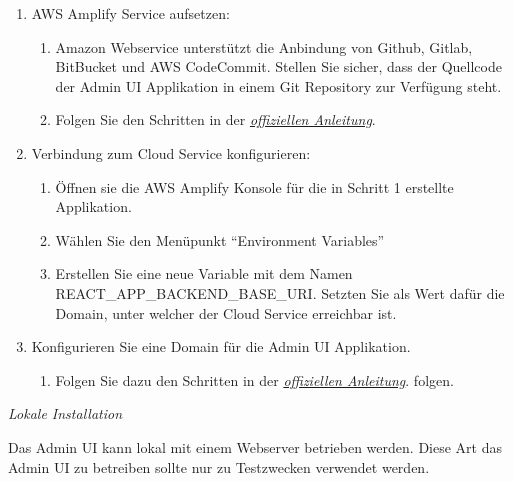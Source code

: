 \begin{enumerate}
    \item AWS Amplify Service aufsetzen:
    \begin{enumerate}
        \item Amazon Webservice unterstützt die Anbindung von Github, Gitlab, BitBucket und AWS CodeCommit. Stellen Sie sicher, dass der Quellcode der Admin UI Applikation in einem Git Repository zur Verfügung steht.
        \item Folgen Sie den Schritten in der \href{https://docs.aws.amazon.com/amplify/latest/userguide/getting-started.html}{\textit{offiziellen Anleitung}}.\cite{aws-amplify}
    \end{enumerate}
    \item Verbindung zum Cloud Service konfigurieren:
    \begin{enumerate}
        \item Öffnen sie die AWS Amplify Konsole für die in Schritt 1 erstellte Applikation.
        \item Wählen Sie den Menüpunkt ``Environment Variables''
        \item Erstellen Sie eine neue Variable mit dem Namen REACT\_APP\_BACKEND\_BASE\_URI. Setzten Sie als Wert dafür die Domain, unter welcher der Cloud Service erreichbar ist.
    \end{enumerate}
    \item Konfigurieren Sie eine Domain für die Admin UI Applikation.
    \begin{enumerate}
        \item Folgen Sie dazu den Schritten in der \href{https://docs.aws.amazon.com/amplify/latest/userguide/custom-domains.html}{\textit{offiziellen Anleitung}}.\cite{aws-amplify-domain} folgen.
    \end{enumerate}
\end{enumerate}

\textit{Lokale Installation}

Das Admin UI kann lokal mit einem Webserver betrieben werden.
Diese Art das Admin UI zu betreiben sollte nur zu Testzwecken verwendet werden.



